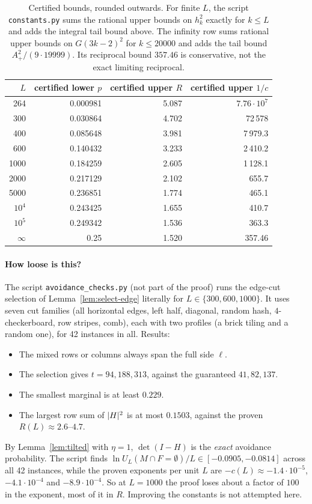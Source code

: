 \begin{table}[t]
\centering\small
\begin{tabular}{@{}rrrr@{}}
\toprule
$L$ & certified lower $p$ & certified upper $R$ & certified upper $1/c$\\
\midrule
264 & 0.000981 & 5.087 & $7.76\cdot10^7$\\
300 & 0.030864 & 4.702 & 72\,578\\
400 & 0.085648 & 3.981 & 7\,979.3\\
600 & 0.140432 & 3.233 & 2\,410.2\\
1000 & 0.184259 & 2.605 & 1\,128.1\\
2000 & 0.217129 & 2.102 & 655.7\\
5000 & 0.236851 & 1.774 & 465.1\\
$10^4$ & 0.243425 & 1.655 & 410.7\\
$10^5$ & 0.249342 & 1.536 & 363.3\\
$\infty$ & 0.25 & 1.520 & 357.46\\
\bottomrule
\end{tabular}
\caption{Certified bounds, rounded outwards. For finite $L$, the script \texttt{constants.py} sums the rational upper bounds on $h_k^2$ exactly for $k\le L$ and adds the integral tail bound above. The infinity row sums rational upper bounds on $G(3k-2)^2$ for $k\le20000$ and adds the tail bound $A_+^2/(9\cdot19999)$. Its reciprocal bound $357.46$ is conservative, not the exact limiting reciprocal.}
\label{tab:constants}
\end{table}

\paragraph{How loose is this?} The script \texttt{avoidance\_checks.py} (not part of the proof) runs the edge-cut selection of Lemma~\ref{lem:select-edge} literally for $L\in\{300,600,1000\}$. It uses seven cut families (all horizontal edges, left half, diagonal, random hash, $4$-checkerboard, row stripes, comb), each with two profiles (a brick tiling and a random one), for 42 instances in all. Results:
\begin{itemize}
\item The mixed rows or columns always span the full side $\ell$.
\item The selection gives $t=94,188,313$, against the guaranteed $41,82,137$.
\item The smallest marginal is at least $0.229$.
\item The largest row sum of $\lvert H\rvert^2$ is at most $0.1503$, against the proven $R(L)\approx2.6$--$4.7$.
\end{itemize}
By Lemma~\ref{lem:tilted} with $\eta=1$, $\det(I-H)$ is the \emph{exact} avoidance probability. The script finds $\ln U_L(M\cap F=\emptyset)/L\in[-0.0905,-0.0814]$ across all 42 instances, while the proven exponents per unit $L$ are $-c(L)\approx-1.4\cdot10^{-5}$, $-4.1\cdot10^{-4}$ and $-8.9\cdot10^{-4}$. So at $L=1000$ the proof loses about a factor of $100$ in the exponent, most of it in $R$. Improving the constants is not attempted here.


